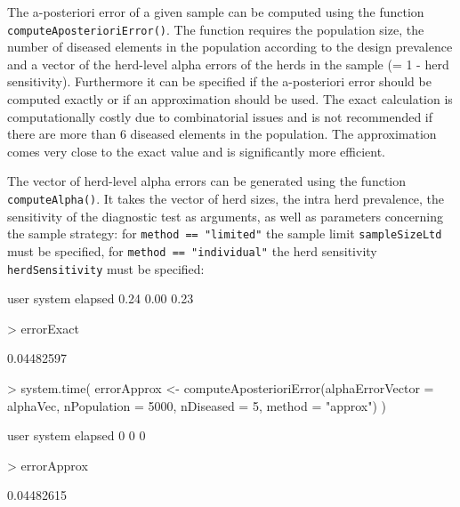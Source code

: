 \documentclass[nojss]{jss}
\begin{document}
The a-posteriori error  of a given sample can be computed using the function  \texttt{computeAposterioriError()}. The function requires the population size, the number of diseased elements in the population according to the design prevalence and a vector of the herd-level alpha errors of the herds in the sample (= 1 - herd sensitivity). Furthermore it can be specified if the a-posteriori error should be computed exactly or if an approximation should be used. The exact calculation is computationally costly due to combinatorial issues and is not recommended if there are more than 6 diseased elements in the population. The approximation comes very close to the exact value and is significantly more efficient.

The vector of herd-level alpha errors can be generated using the function \texttt{computeAlpha()}.  It takes the vector of herd sizes, the intra herd prevalence, the sensitivity of the diagnostic test as arguments, as well as parameters concerning the sample strategy: for \texttt{method == "limited"} the sample limit \texttt{sampleSizeLtd} must be specified, for \texttt{method == "individual"} the herd sensitivity \texttt{herdSensitivity} must be specified:

\begin{Schunk}
\begin{Soutput}
   user  system elapsed 
   0.24    0.00    0.23 
\end{Soutput}
\begin{Sinput}
> errorExact
\end{Sinput}
\begin{Soutput}
[1] 0.04482597
\end{Soutput}
\begin{Sinput}
> system.time({
   errorApprox <- computeAposterioriError(alphaErrorVector = alphaVec,
       nPopulation = 5000, nDiseased = 5, method = "approx")
   })
\end{Sinput}
\begin{Soutput}
   user  system elapsed 
      0       0       0 
\end{Soutput}
\begin{Sinput}
> errorApprox
\end{Sinput}
\begin{Soutput}
[1] 0.04482615
\end{Soutput}
\end{Schunk}



\printindex


\end{document}

